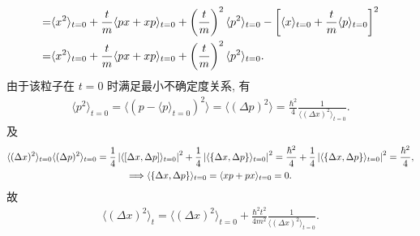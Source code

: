\documentclass{assignment}
\begin{document}
\begin{sol}
\begin{align}
        \notag=&\langle x^2\rangle_{t=0}+\frac{t}{m}\langle px+xp\rangle_{t=0}+\left(\frac{t}{m}\right)^2\langle p^2\rangle_{t=0}-\left[\langle x\rangle_{t=0}+\frac{t}{m}\langle p\rangle_{t=0}\right]^2\\
        =&\langle x^2\rangle_{t=0}+\frac{t}{m}\langle px+xp\rangle_{t=0}+\left(\frac{t}{m}\right)^2\langle p^2\rangle_{t=0}.
    \end{align}
    由于该粒子在 $t=0$ 时满足最小不确定度关系, 有
    \begin{gather}
        \langle p^2\rangle_{t=0}=\langle(p-\langle p\rangle_{t=0})^2\rangle=\langle(\Delta p)^2\rangle=\frac{\hbar^2}{4}\frac{1}{\langle(\Delta x)^2\rangle_{t=0}}.
    \end{gather}
    及
    \begin{gather}
        \langle(\Delta x)^2\rangle_{t=0}\langle(\Delta p)^2\rangle_{t=0}=\frac{1}{4}\left\lvert\langle[\Delta x,\Delta p]\rangle_{t=0}\right\rvert^2+\frac{1}{4}\left\lvert\langle\{\Delta x,\Delta p\}\rangle_{t=0}\right\rvert^2=\frac{\hbar^2}{4}+\frac{1}{4}\left\lvert\langle\{\Delta x,\Delta p\}\rangle_{t=0}\right\rvert^2=\frac{\hbar^2}{4},\\
        \Longrightarrow\langle\{\Delta x,\Delta p\}\rangle_{t=0}=\langle xp+px\rangle_{t=0}=0.
    \end{gather}
    故
    \begin{align}
        \langle(\Delta x)^2\rangle_t=\langle(\Delta x)^2\rangle_{t=0}+\frac{\hbar^2t^2}{4m^2}\frac{1}{\langle(\Delta x)^2\rangle_{t=0}}.
    \end{align}
\end{sol}
\end{document}
